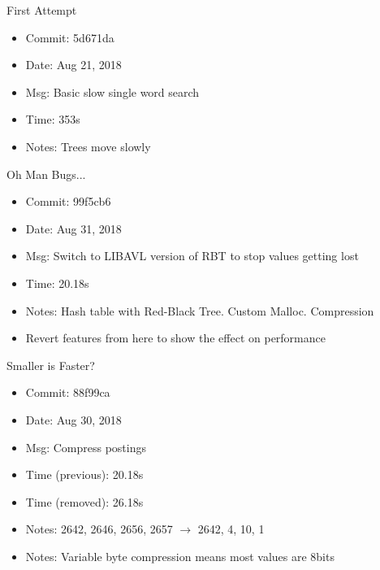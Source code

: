 \documentclass{beamer}
\begin{document}

\begin{frame}{First Attempt}
	\begin{itemize}
	\item Commit: 5d671da
	\item Date: Aug 21, 2018
	\item Msg: Basic slow single word search
	\item Time: 353s
	\item Notes: Trees move slowly
	\end{itemize}
	\searchone


\end{frame}

\begin{frame}{Oh Man Bugs...}
	\begin{itemize}
	\item Commit: 99f5cb6
	\item Date: Aug 31, 2018
	\item Msg: Switch to LIBAVL version of RBT to stop values getting lost
	\item Time: 20.18s
	\item Notes: Hash table with Red-Black Tree. Custom Malloc. Compression
	\item Revert features from here to show the effect on performance
	\end{itemize}
\end{frame}

\begin{frame}{Smaller is Faster?}
	\begin{itemize}
	\item Commit: 88f99ca
	\item Date: Aug 30, 2018
	\item Msg: Compress postings
	\item Time (previous): 20.18s
	\item Time (removed): 26.18s
	\item Notes: 2642, 2646, 2656, 2657 $\rightarrow$ 2642, 4, 10, 1
	\item Notes: Variable byte compression means most values are 8bits
	\end{itemize}
\end{frame}
\end{document}
